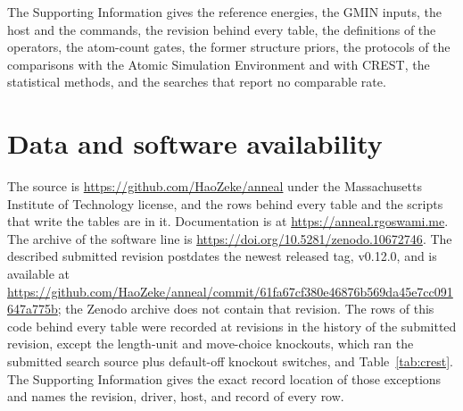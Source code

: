 \documentclass[journal=jctcce,manuscript=article]{achemso}
\begin{document}
\begin{suppinfo}
The Supporting Information gives the reference energies, the GMIN inputs, the
host and the commands, the revision behind every table, the definitions of
the operators, the atom-count gates, the former structure priors, the
protocols of the comparisons with the Atomic Simulation Environment and with
CREST, the statistical methods, and the searches that report no comparable
rate.
\end{suppinfo}

\section*{Data and software availability}
The source is \url{https://github.com/HaoZeke/anneal} under the
Massachusetts Institute of Technology license, and the rows behind every table
and the scripts that write the tables are in it.
Documentation is at \url{https://anneal.rgoswami.me}.
The archive of the software line is
\url{https://doi.org/10.5281/zenodo.10672746}.
The described submitted revision postdates the newest released tag,
v0.12.0, and is available at
\url{https://github.com/HaoZeke/anneal/commit/61fa67cf380e46876b569da45e7cc091647a775b};
the Zenodo archive does not contain that revision.
The rows of this code behind every table were recorded at revisions in the
history of the submitted revision, except the length-unit and move-choice
knockouts, which ran the submitted search source plus default-off knockout
switches, and Table~\ref{tab:crest}.
The Supporting Information gives the exact record location of those
exceptions and names the revision, driver, host, and record of every row.


\end{document}
